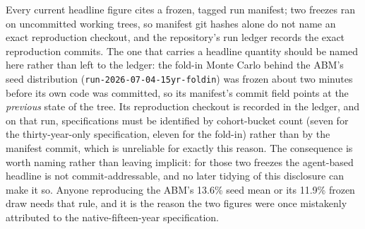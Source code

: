 \documentclass[12pt]{article}
\begin{document}
Every current headline figure cites a frozen, tagged run manifest; two freezes ran on uncommitted working trees, so manifest git hashes alone do not name an exact reproduction checkout, and the repository's run ledger records the exact reproduction commits. The one that carries a headline quantity should be named here rather than left to the ledger: the fold-in Monte Carlo behind the ABM's seed distribution (\texttt{run-2026-07-04-15yr-foldin}) was frozen about two minutes before its own code was committed, so its manifest's commit field points at the \emph{previous} state of the tree. Its reproduction checkout is recorded in the ledger, and on that run, specifications must be identified by cohort-bucket count (seven for the thirty-year-only specification, eleven for the fold-in) rather than by the manifest commit, which is unreliable for exactly this reason. The consequence is worth naming rather than leaving implicit: for those two freezes the agent-based headline is not commit-addressable, and no later tidying of this disclosure can make it so. Anyone reproducing the ABM's 13.6\% seed mean or its 11.9\% frozen draw needs that rule, and it is the reason the two figures were once mistakenly attributed to the native-fifteen-year specification.
\end{document}

